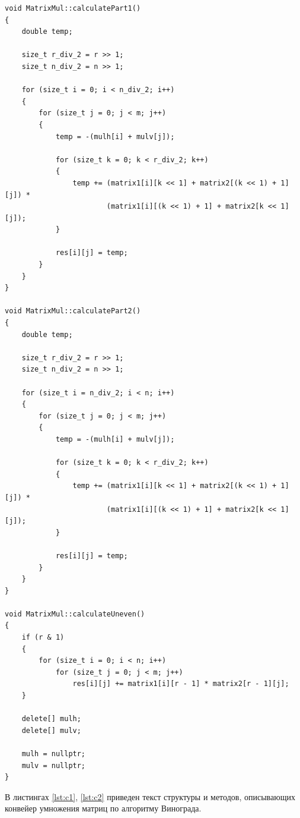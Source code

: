 \begin{lstlisting}[caption={Алгоритм Винограда, ч. 3}, label=lst:m3]
void MatrixMul::calculatePart1()
{
    double temp;

    size_t r_div_2 = r >> 1;
    size_t n_div_2 = n >> 1;

    for (size_t i = 0; i < n_div_2; i++)
    {
        for (size_t j = 0; j < m; j++)
        {
            temp = -(mulh[i] + mulv[j]);

            for (size_t k = 0; k < r_div_2; k++)
            {
                temp += (matrix1[i][k << 1] + matrix2[(k << 1) + 1][j]) *
                        (matrix1[i][(k << 1) + 1] + matrix2[k << 1][j]);
            }

            res[i][j] = temp;
        }
    }
}

void MatrixMul::calculatePart2()
{
    double temp;

    size_t r_div_2 = r >> 1;
    size_t n_div_2 = n >> 1;

    for (size_t i = n_div_2; i < n; i++)
    {
        for (size_t j = 0; j < m; j++)
        {
            temp = -(mulh[i] + mulv[j]);

            for (size_t k = 0; k < r_div_2; k++)
            {
                temp += (matrix1[i][k << 1] + matrix2[(k << 1) + 1][j]) *
                        (matrix1[i][(k << 1) + 1] + matrix2[k << 1][j]);
            }

            res[i][j] = temp;
        }
    }
}

void MatrixMul::calculateUneven()
{
    if (r & 1)
    {
        for (size_t i = 0; i < n; i++)
            for (size_t j = 0; j < m; j++)
                res[i][j] += matrix1[i][r - 1] * matrix2[r - 1][j];
    }

    delete[] mulh;
    delete[] mulv;

    mulh = nullptr;
    mulv = nullptr;
}
\end{lstlisting}

В листингах \ref{lst:c1}, \ref{lst:c2} приведен текст структуры и методов, описывающих конвейер умножения матриц по алгоритму Винограда.

